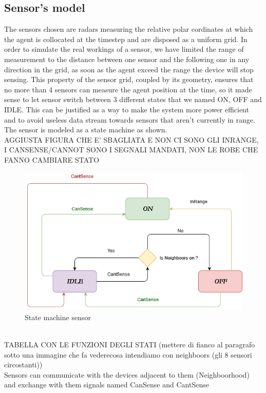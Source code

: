 \documentclass{article}
\begin{document}
\begin{multicols}{2}
    \subsection*{Sensor's model}
    The sensors chosen are radars measuring the relative polar cordinates at which the agent is collocated at the timestep and
    are disposed as a uniform grid. In order to simulate the real workings of a sensor, we have limited the range of measurement to the distance
    between one sensor and the following one in any direction in the grid, as soon as the agent exceed the range the device will stop sensing.
    This property of the sensor grid, coupled by its geometry, ensures that no more than 4 sensors can measure the agent position at the time,
    so it made sense to let sensor switch between 3 different states that we named ON, OFF and IDLE. This can be justified as a way to make the system
    more power efficient and to avoid useless data stream towards sensors that aren't currently in range.
    The sensor is modeled as a state machine as shown.
    \\
    AGGIUSTA FIGURA CHE E' SBAGLIATA E NON CI SONO GLI INRANGE, I CANSENSE/CANNOT SONO I SEGNALI MANDATI, NON LE ROBE CHE FANNO CAMBIARE STATO 
    \begin{figure}[h!]
        \centering
        \includegraphics[scale=0.05]{UntitledDiagram.png}
        \caption{State machine sensor}
        \label{fig:galaxy}
    \end{figure}
    \\
    TABELLA CON LE FUNZIONI DEGLI STATI (mettere di fianco al paragrafo sotto una immagine che fa  vederecosa intendiamo con neighboors (gli 8 
    sensori circostanti))
    \\
    Sensors can communicate with the devices adjacent to them (Neighboorhood) and exchange with them signals named CanSense and CantSense

\end{multicols}
\end{document}
